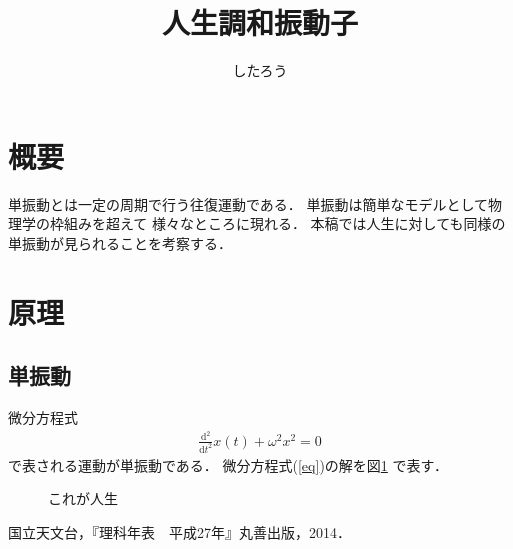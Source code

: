 \documentclass[a4paper]{jarticle}
\title{人生調和振動子}
\author{したろう}
\date{}
\def\df#1#2{\frac{\mathrm{d} #1}{\mathrm{d} #2}}		%
\begin{document}
\maketitle
\section{概要}
単振動とは一定の周期で行う往復運動である．
単振動は簡単なモデルとして物理学の枠組みを超えて
様々なところに現れる．
本稿では人生に対しても同様の単振動が見られることを考察する．

\section{原理}
\subsection{単振動}
微分方程式
\begin{align}
	\df{^2}{t^2} x(t)
	+
	\omega^2 x^2
	=
	0
	\label{eq}
\end{align}
で表される運動が単振動である．
微分方程式(\ref{eq})の解を図\ref{fig}
で表す．
\begin{figure}[htbp]
	\begin{center}
		
		\label{fig}
		\caption{これが人生}
	\end{center}
\end{figure}

\newpage
\begin{thebibliography}{9}
		国立天文台，『理科年表　平成27年』丸善出版，2014．
\end{thebibliography}
\end{document}
